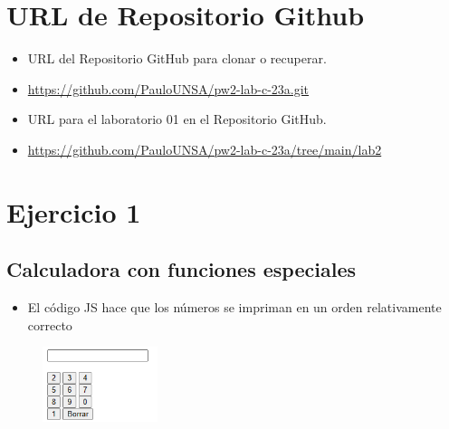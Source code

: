\documentclass{article}
\begin{document}
	\section{URL de Repositorio Github}
	\begin{itemize}
		\item URL del Repositorio GitHub para clonar o recuperar.
		\item \url{https://github.com/PauloUNSA/pw2-lab-c-23a.git}
		\item URL para el laboratorio 01 en el Repositorio GitHub.
		\item \url{https://github.com/PauloUNSA/pw2-lab-c-23a/tree/main/lab2}
	\end{itemize}
	\section{Ejercicio 1}
	\subsection{Calculadora con funciones especiales}
	
	\begin{itemize}	
		\item El código JS hace que los números se impriman en un orden relativamente correcto
	\end{itemize}
	
	\begin{figure}[H]
		\centering
		\includegraphics[width=0.3\textwidth,keepaspectratio]{img/calc01.png}
	\end{figure}
\end{document}
